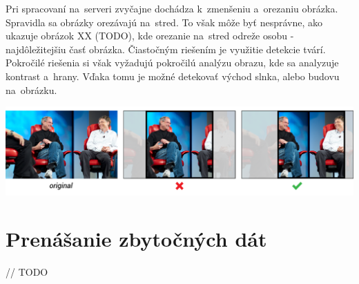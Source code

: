 Pri spracovaní na~serveri zvyčajne dochádza k~zmenšeniu a~orezaniu obrázka. Spravidla sa obrázky orezávajú na~stred. To však môže byť nesprávne, ako ukazuje obrázok XX (TODO), kde orezanie na~stred odreže osobu - najdôležitejšiu časť obrázka. Čiastočným riešením je využitie detekcie tvárí. Pokročilé riešenia si však vyžadujú pokročilú analýzu obrazu, kde sa analyzuje kontrast a~hrany. Vďaka tomu je možné detekovať východ slnka, alebo budovu na~obrázku. 

\includegraphics[width=\textwidth]{jobs_gates}

\section{Prenášanie zbytočných dát}

// TODO